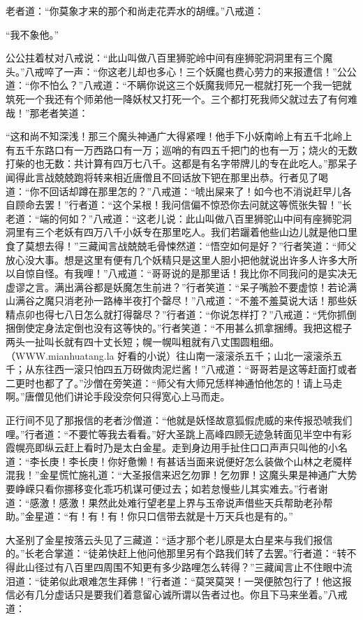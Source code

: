 \documentclass[12pt,UTF8]{ctexbook}
\begin{document}
老者道：“你莫象才来的那个和尚走花弄水的胡缠。”八戒道：

“我不象他。”

公公拄着杖对八戒说：“此山叫做八百里狮驼岭中间有座狮驼洞洞里有三个魔头。”八戒啐了一声：“你这老儿却也多心！三个妖魔也费心劳力的来报遭信！”公公道：“你不怕么？”八戒道：“不瞒你说这三个妖魔我师兄一棍就打死一个我一钯就筑死一个我还有个师弟他一降妖杖又打死一个。三个都打死我师父就过去了有何难哉！”那老者笑道：

“这和尚不知深浅！那三个魔头神通广大得紧哩！他手下小妖南岭上有五千北岭上有五千东路口有一万西路口有一万；巡哨的有四五千把门的也有一万；烧火的无数打柴的也无数：共计算有四万七八千。这都是有名字带牌儿的专在此吃人。”那呆子闻得此言战兢兢跑将转来相近唐僧且不回话放下钯在那里出恭。行者见了喝道：“你不回话却蹲在那里怎的？”八戒道：“唬出屎来了！如今也不消说赶早儿各自顾命去罢！”行者道：“这个呆根！我问信偏不惊恐你去问就这等慌张失智！”长老道：“端的何如？”八戒道：“这老儿说：此山叫做八百里狮驼山中间有座狮驼洞洞里有三个老妖有四万八千小妖专在那里吃人。我们若躧着他些山边儿就是他口里食了莫想去得！”三藏闻言战兢兢毛骨悚然道：“悟空如何是好？”行者笑道：“师父放心没大事。想是这里有便有几个妖精只是这里人胆小把他就说出许多人许多大所以自惊自怪。有我哩！”八戒道：“哥哥说的是那里话！我比你不同我问的是实决无虚谬之言。满出满谷都是妖魔怎生前进？”行者笑道：“呆子嘴脸不要虚惊！若论满山满谷之魔只消老孙一路棒半夜打个罄尽！”八戒道：“不羞不羞莫说大话！那些妖精点卯也得七八日怎么就打得罄尽？”行者道：“你说怎样打？”八戒道：“凭你抓倒捆倒使定身法定倒也没有这等快的。”行者笑道：“不用甚么抓拿捆缚。我把这棍子两头一扯叫长就有四十丈长短；幌一幌叫粗就有八丈围圆粗细。（WWW.mianhuatang.la 好看的小说）往山南一滚滚杀五千；山北一滚滚杀五千；从东往西一滚只怕四五万砑做肉泥烂酱！”八戒道：“哥哥若是这等赶面打或者二更时也都了了。”沙僧在旁笑道：“师父有大师兄恁样神通怕他怎的！请上马走啊。”唐僧见他们讲论手段没奈何只得宽心上马而走。

正行间不见了那报信的老者沙僧道：“他就是妖怪故意狐假虎威的来传报恐唬我们哩。”行者道：“不要忙等我去看看。”好大圣跳上高峰四顾无迹急转面见半空中有彩霞幌亮即纵云赶上看时乃是太白金星。走到身边用手扯住口口声声只叫他的小名道：“李长庚！李长庚！你好惫懒！有甚话当面来说便好怎么装做个山林之老魇样混我！”金星慌忙施礼道：“大圣报信来迟乞勿罪！乞勿罪！这魔头果是神通广大势要峥嵘只看你挪移变化乖巧机谋可便过去；如若怠慢些儿其实难去。”行者谢道：“感激！感激！果然此处难行望老星上界与玉帝说声借些天兵帮助老孙帮助。”金星道：“有！有！有！你只口信带去就是十万天兵也是有的。”

大圣别了金星按落云头见了三藏道：“适才那个老儿原是太白星来与我们报信的。”长老合掌道：“徒弟快赶上他问他那里另有个路我们转了去罢。”行者道：“转不得此山径过有八百里四周围不知更有多少路哩怎么转得？”三藏闻言止不住眼中流泪道：“徒弟似此艰难怎生拜佛！”行者道：“莫哭莫哭！一哭便脓包行了！他这报信必有几分虚话只是要我们着意留心诚所谓以告者过也。你且下马来坐着。”八戒道：
\end{document}
